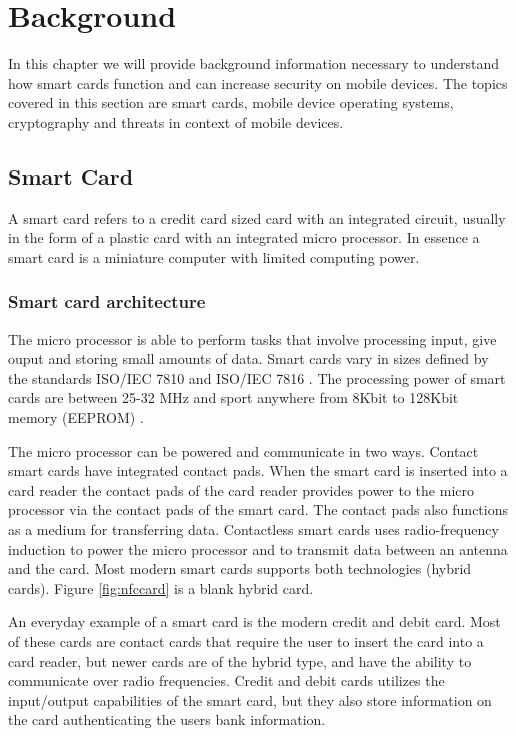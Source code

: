 \chapter{Background}
In this chapter we will provide background information necessary to understand how smart cards function and can increase security on mobile devices. The topics covered in this section are smart cards, mobile device operating systems, cryptography and threats in context of mobile devices.

\section{Smart Card}
\label{sec:smartcard}
A smart card refers to a credit card sized card with an integrated circuit, usually in the form of a plastic card with an integrated micro processor. In essence a smart card is a miniature computer with limited computing power.

\subsection{Smart card architecture}
The micro processor is able to perform tasks that involve processing input, give ouput and storing small amounts of data. Smart cards vary in sizes defined by the standards ISO/IEC 7810 \cite{iso7810} and ISO/IEC 7816 \cite{iso7816}. The processing power of smart cards are between 25-32 MHz and sport anywhere from 8Kbit to 128Kbit memory (EEPROM) \cite{cardProcessing}.

The micro processor can be powered and communicate in two ways. Contact smart cards have integrated contact pads. When the smart card is inserted into a card reader the contact pads of the card reader provides power to the micro processor via the contact pads of the smart card. The contact pads also functions as a medium for transferring data. Contactless smart cards uses radio-frequency induction to power the micro processor and to transmit data between an antenna and the card. Most modern smart cards supports both technologies (hybrid cards). Figure \ref{fig:nfccard} is a blank hybrid card.

An everyday example of a smart card is the modern credit and debit card. Most of these cards are contact cards that require the user to insert the card into a card reader, but newer cards are of the hybrid type, and have the ability to communicate over radio frequencies. Credit and debit cards utilizes the input/output capabilities of the smart card, but they also store information on the card authenticating the users bank information.

